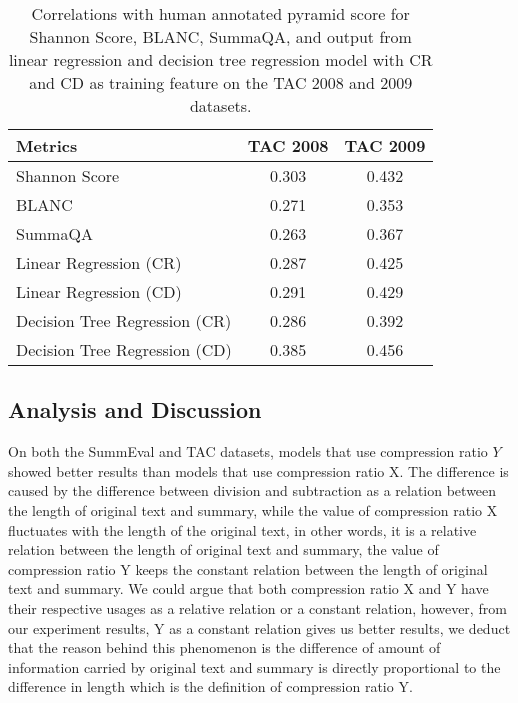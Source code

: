 \begin{table}[th]
	\scriptsize
	\centering
\begin{tabular}{lcc}
		\hline
		Metrics & TAC 2008 & TAC 2009\\
		\hline
		Shannon Score & 0.303 & 0.432\\
		BLANC &  0.271 & 0.353\\
		SummaQA & 0.263 & 0.367\\
		Linear Regression (CR) & 0.287 & 0.425\\
    	Linear Regression (CD) & 0.291 & 0.429\\
		Decision Tree Regression (CR) & 0.286 & 0.392\\
		Decision Tree Regression (CD) & 0.385 & 0.456\\
		\hline
\end{tabular}
	\caption{Correlations with human annotated pyramid score for Shannon Score, BLANC, SummaQA, and output from linear regression and decision tree regression model with CR and CD as training feature on the TAC 2008 and 2009 datasets.}
	\label{tab:tacscore}
\end{table}

\subsection{Analysis and Discussion}
On both the SummEval and TAC datasets, models that use compression ratio $Y$ showed better results than models that use compression ratio X. The difference is caused by the difference between division and subtraction as a relation between the length of original text and summary, while the value of compression ratio X fluctuates with the length of the original text, in other words, it is a relative relation between the length of original text and summary, the value of compression ratio Y keeps the constant relation between the length of original text and summary. We could argue that both compression ratio X and Y have their respective usages as a relative relation or a constant relation, however, from our experiment results, Y as a constant relation gives us better results, we deduct that the reason behind this phenomenon is the difference of amount of information carried by original text and summary is directly proportional to the difference in length which is the definition of compression ratio Y.

